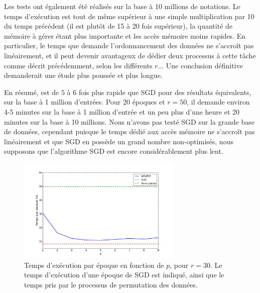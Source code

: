 \documentclass[10pt,a4paper]{article}
\begin{document}
Les tests ont également été réalisés sur la base à 10 millions de notations. Le temps d'exécution est tout de même supérieur à une simple multiplication par 10 du temps précédent (il est plutôt de 15 à 20 fois supérieur), la quantité de mémoire à gérer étant plus importante et les accès mémoire moins rapides. En particulier, le temps que demande l'ordonnancement des données ne s'accroît pas linéairement, et il peut devenir avantageux de dédier deux processus à cette tâche comme décrit précédemment, selon les différents $r$... Une conclusion définitive demanderait une étude plus poussée et plus longue.

En résumé, \jel est de $5$ à $6$ fois plus rapide que SGD pour des résultats équivalents, sur la base à 1 million d'entrées. Pour 20 époques et $r=50$, il demande environ 4-5 minutes sur la base à 1 million d'entrée et un peu plus d'une heure et 20 minutes sur la base à 10 millions. Nous n'avons pas testé SGD sur la grande base de données, cependant puisque le temps dédié aux accès mémoire ne s'accroît pas linéairement et que SGD en possède un grand nombre non-optimisés, nous supposons que l'algorithme SGD est encore considérablement plus lent.

\begin{figure}[h]
\centering
\includegraphics[width=0.7\textwidth]{fig/time_jel1}
\caption{Temps d'exécution par époque en fonction de $p$, pour $r=30$. Le temps d'exécution d'une époque de SGD est indiqué, ainsi que le temps pris par le processus de permutation des données.}
\label{time}
\end{figure}

\end{document}
